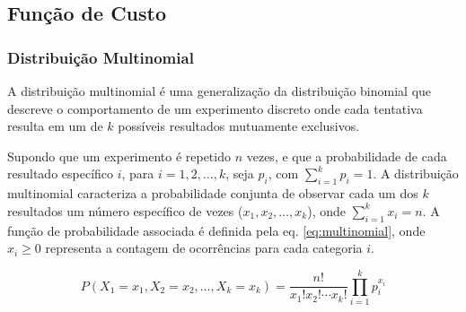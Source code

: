 





\subsection{Função de Custo}
\label{sec:modelo-loss}


\subsubsection{Distribuição Multinomial}
\label{sec:modelo-multi}

A distribuição multinomial \citep{distbook-multinomial} é uma generalização da distribuição binomial \citep{distbook-binomial} que descreve o comportamento de um experimento discreto onde cada tentativa resulta em um de $k$ possíveis resultados mutuamente exclusivos.

Supondo que um experimento é repetido $n$ vezes, e que a probabilidade de cada resultado específico $i$, para $i=1,2,\dots,k$, seja $p_i$, com $\sum_{i=1}^k p_i = 1$. A distribuição multinomial caracteriza a probabilidade conjunta de observar cada um dos $k$ resultados um número específico de vezes ($x_1, x_2,\dots, x_k$), onde $\sum_{i=1}^k x_i = n$. A função de probabilidade associada é definida pela eq. \eqref{eq:multinomial}, onde \( x_i \geq 0 \) representa a contagem de ocorrências para cada categoria \( i \).

\begin{equation}\label{eq:multinomial}
  P(X_1 = x_1, X_2 = x_2, \dots, X_k = x_k) = \frac{n!}{x_1! x_2! \cdots x_k!} \prod_{i=1}^k p_i^{x_i}
\end{equation}

